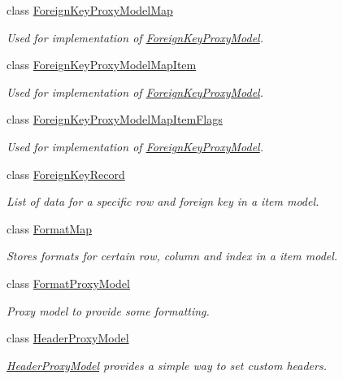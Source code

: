 \begin{DoxyCompactItemize}
class \hyperlink{class_mdt_1_1_item_model_1_1_foreign_key_proxy_model_map}{Foreign\+Key\+Proxy\+Model\+Map}
\begin{DoxyCompactList}\small\item\em Used for implementation of \hyperlink{class_mdt_1_1_item_model_1_1_foreign_key_proxy_model}{Foreign\+Key\+Proxy\+Model}. \end{DoxyCompactList}\item 
class \hyperlink{class_mdt_1_1_item_model_1_1_foreign_key_proxy_model_map_item}{Foreign\+Key\+Proxy\+Model\+Map\+Item}
\begin{DoxyCompactList}\small\item\em Used for implementation of \hyperlink{class_mdt_1_1_item_model_1_1_foreign_key_proxy_model}{Foreign\+Key\+Proxy\+Model}. \end{DoxyCompactList}\item 
class \hyperlink{class_mdt_1_1_item_model_1_1_foreign_key_proxy_model_map_item_flags}{Foreign\+Key\+Proxy\+Model\+Map\+Item\+Flags}
\begin{DoxyCompactList}\small\item\em Used for implementation of \hyperlink{class_mdt_1_1_item_model_1_1_foreign_key_proxy_model}{Foreign\+Key\+Proxy\+Model}. \end{DoxyCompactList}\item 
class \hyperlink{class_mdt_1_1_item_model_1_1_foreign_key_record}{Foreign\+Key\+Record}
\begin{DoxyCompactList}\small\item\em List of data for a specific row and foreign key in a item model. \end{DoxyCompactList}\item 
class \hyperlink{class_mdt_1_1_item_model_1_1_format_map}{Format\+Map}
\begin{DoxyCompactList}\small\item\em Stores formats for certain row, column and index in a item model. \end{DoxyCompactList}\item 
class \hyperlink{class_mdt_1_1_item_model_1_1_format_proxy_model}{Format\+Proxy\+Model}
\begin{DoxyCompactList}\small\item\em Proxy model to provide some formatting. \end{DoxyCompactList}\item 
class \hyperlink{class_mdt_1_1_item_model_1_1_header_proxy_model}{Header\+Proxy\+Model}
\begin{DoxyCompactList}\small\item\em \hyperlink{class_mdt_1_1_item_model_1_1_header_proxy_model}{Header\+Proxy\+Model} provides a simple way to set custom headers. \end{DoxyCompactList}\item 

\end{DoxyCompactItemize}
